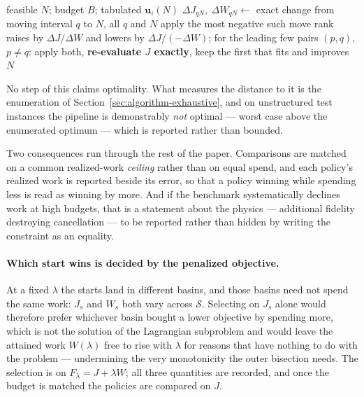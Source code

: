 \begin{algorithm}[!htbp]
\caption{\textsc{Polish}: search under the ceiling, with no penalty term}
\label{alg:polish}
\begin{algorithmic}[1]
\Require feasible $N$; budget $B$; tabulated $\mathbf u_i(N)$
\Repeat
  \State $\Delta J_{qN},\ \Delta W_{qN} \gets$ exact change from moving
    interval $q$ to $N$, all $q$ and $N$ 
    \State apply the most negative such move
  \Else
    \State rank raises by $\Delta J/\Delta W$ and lowers by
      $\Delta J/(-\Delta W)$; for the leading few pairs $(p,q)$, $p\ne q$:
    \State \quad apply both, \textbf{re-evaluate $J$ exactly}, keep the first
      that fits and improves 
  \EndIf
{}
\State \Return $N$
\end{algorithmic}
\end{algorithm}

No step of this claims optimality. What measures the distance to it is the
enumeration of Section~\ref{sec:algorithm-exhaustive}, and on unstructured
test instances the pipeline is demonstrably \emph{not} optimal --- worst case
 above the enumerated optimum --- which is reported rather than
bounded.

Two consequences run through the rest of the paper. Comparisons are matched on
a common realized-work \emph{ceiling} rather than on equal spend, and each
policy's realized work is reported beside its error, so that a policy winning
while spending less is read as winning by more. And if the benchmark
systematically declines work at high budgets, that is a statement about the
physics --- additional fidelity destroying cancellation --- to be reported
rather than hidden by writing the constraint as an equality.

\paragraph{Which start wins is decided by the penalized objective.} At a fixed
$\lambda$ the starts land in different basins, and those basins need not spend
the same work: $J_s$ and $W_s$ both vary across $\mathcal S$. Selecting on
$J_s$ alone would therefore prefer whichever basin bought a lower objective by
spending more, which is not the solution of the Lagrangian subproblem and
would leave the attained work $W(\lambda)$ free to rise with $\lambda$ for
reasons that have nothing to do with the problem --- undermining the very
monotonicity the outer bisection needs. The selection is on
$F_\lambda=J+\lambda W$; all three quantities are recorded, and once the
budget is matched the policies are compared on $J$.

